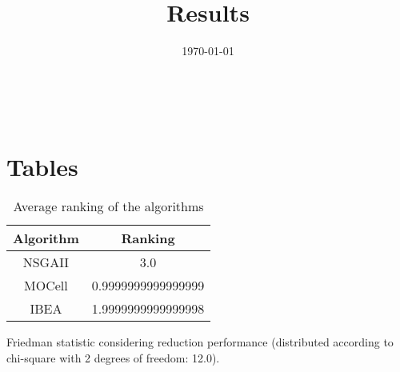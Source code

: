 \documentclass{article}
\title{Results}
\author{}
\date{\today}
\begin{document}
\oddsidemargin 0in \topmargin 0in\maketitle
\
\section{Tables}
\begin{table}[!htp]
\centering
\caption{Average ranking of the algorithms}
\begin{tabular}{c|c}
Algorithm&Ranking\\
\hline
NSGAII&3.0\\
MOCell&0.9999999999999999\\
IBEA&1.9999999999999998\\
\end{tabular}
\end{table}


Friedman statistic considering reduction performance (distributed according to chi-square with 2 degrees of freedom: 12.0).
\end{document}
